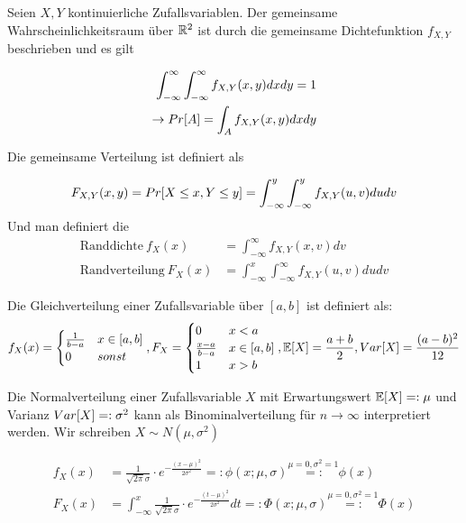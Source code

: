 \begin{definition}
	Seien $X,Y$ kontinuierliche Zufallsvariablen. Der gemeinsame Wahrscheinlichkeitsraum über $\mathbb{R}^2$ ist durch die gemeinsame Dichtefunktion $f_{X,Y}$ beschrieben und es gilt
	
	\begin{align*}
		\int_{-\infty}^\infty \int_{-\infty}^\infty f_{X,Y}(x,y)dx dy = 1 \\
		\rightarrow Pr[A] = \int_A f_{X,Y}(x,y) dx dy
	\end{align*}
	
	Die gemeinsame Verteilung ist definiert als
	
	\begin{align*}
		F_{X,Y}(x,y) = Pr[X \leq x, Y \leq y] = \int_{- \infty}^y \int_{- \infty}^y f_{X,Y}(u,v) du dv
	\end{align*}
	Und man definiert die
	\begin{align*}
		\text{Randdichte} \medspace f_X(x) &= \int_{- \infty}^\infty f_{X,Y}(x,v) dv \\
		\text{Randverteilung} \medspace F_X(x) &= \int_{- \infty}^x \int_{-\infty}^{\infty} f_{X,Y}(u,v) du dv	
	\end{align*}
\end{definition}

\begin{definition}[Gleichverteilung]
	Die Gleichverteilung einer Zufallsvariable über $[a,b]$ ist definiert als:
	\begin{align*}
		f_X(x) = \begin{cases}
			\frac{1}{b - a} & x \in [a,b] \\
			0 & sonst
		\end{cases}, 
		F_{X} = \begin{cases}
		0 & x < a \\
		\frac{x - a}{b - a} & x \in [a,b] \\
		1 & x > b
		\end{cases}, \mathbb{E}[X] = \frac{a + b}{2}, Var[X] = \frac{(a-b)^2}{12}
	\end{align*}
\end{definition}


\begin{definition}[Normalverteilung]
	Die Normalverteilung einer Zufallsvariable $X$ mit Erwartungswert $\mathbb{E}[X] =: \mu$ und Varianz $Var[X] =: \sigma^2$ kann als Binominalverteilung für $n \rightarrow \infty$ interpretiert werden. Wir schreiben $X \sim N(\mu, \sigma^2)$
	
	\begin{align*}
	f_X(x) &= \frac{1}{\sqrt{2\pi}\sigma} \cdot e^{-\frac{(x-\mu)^2}{2\sigma^2}}  =: \phi(x;\mu,\sigma) \overset{\mu = 0, \sigma^2 = 1}{=:} \phi(x) \\
	F_X(x) &= \int_{-\infty}^{x} \frac{1}{\sqrt{2\pi}\sigma} \cdot e^{-\frac{(t- \mu)^2}{2 \sigma^2}} dt =: \Phi(x; \mu, \sigma) \overset{\mu = 0, \sigma^2 = 1}{=:} \Phi(x)
	\end{align*}
\end{definition}

